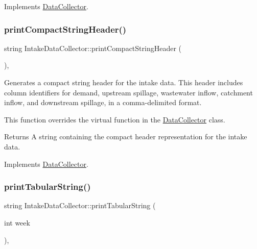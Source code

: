 Implements \mbox{\hyperlink{classDataCollector_a2eac264fa5612aed5a830b12de4f4ae3}{Data\+Collector}}.

\mbox{\label{classIntakeDataCollector_a42d56dd08e57a7e6e48812a2ab522439}} 
\subsubsection{\texorpdfstring{print\+Compact\+String\+Header()}{printCompactStringHeader()}}
{\footnotesize\ttfamily string Intake\+Data\+Collector\+::print\+Compact\+String\+Header (\begin{DoxyParamCaption}{ }\end{DoxyParamCaption})\hspace{0.3cm}{\ttfamily [override]}, {\ttfamily [virtual]}}



Generates a compact string header for the intake data. This header includes column identifiers for demand, upstream spillage, wastewater inflow, catchment inflow, and downstream spillage, in a comma-\/delimited format. 

This function overrides the virtual function in the \mbox{\hyperlink{classDataCollector}{Data\+Collector}} class.

\begin{DoxyReturn}{Returns}
A string containing the compact header representation for the intake data. 
\end{DoxyReturn}


Implements \mbox{\hyperlink{classDataCollector_a98dcb4ec871d9c7fbf7545c64e5ccc67}{Data\+Collector}}.

\mbox{\label{classIntakeDataCollector_ada2b88b7a05455cf6f2eebf82d37b3c5}} 
\subsubsection{\texorpdfstring{print\+Tabular\+String()}{printTabularString()}}
{\footnotesize\ttfamily string Intake\+Data\+Collector\+::print\+Tabular\+String (\begin{DoxyParamCaption}\item[{int}]{week }\end{DoxyParamCaption})\hspace{0.3cm}{\ttfamily [override]}, {\ttfamily [virtual]}}



